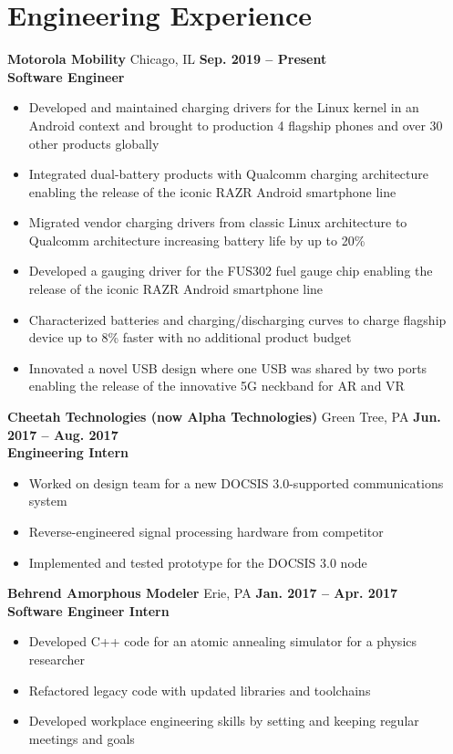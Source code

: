 \documentclass[letterpaper,10pt]{article}
\begin{document}
\section{Engineering Experience}
\textbf{Motorola Mobility} Chicago, IL \hfill \textbf{Sep. 2019 -- Present}\\
\textbf{Software Engineer}
\begin{itemize}
\item Developed and maintained charging drivers for the Linux kernel in an Android context and brought to production 4 flagship phones and over 30 other products globally
\item Integrated dual-battery products with Qualcomm charging architecture enabling the release of the iconic RAZR Android smartphone line
\item Migrated vendor charging drivers from classic Linux architecture to Qualcomm architecture increasing battery life by up to 20\%
\item Developed a gauging driver for the FUS302 fuel gauge chip enabling the release of the iconic RAZR Android smartphone line
\item Characterized batteries and charging/discharging curves to charge flagship device up to 8\% faster with no additional product budget
\item Innovated a novel USB design where one USB was shared by two ports enabling the release of the innovative 5G neckband for AR and VR
\end{itemize}
\textbf{Cheetah Technologies (now Alpha Technologies)} Green Tree, PA \hfill \textbf{Jun. 2017 -- Aug. 2017}\\
\textbf{Engineering Intern}
\begin{itemize}
\item Worked on design team for a new DOCSIS 3.0-supported communications system
\item Reverse-engineered signal processing hardware from competitor
\item Implemented and tested prototype for the DOCSIS 3.0 node
\end{itemize}
\textbf{Behrend Amorphous Modeler} Erie, PA \hfill \textbf{Jan. 2017 -- Apr. 2017}\\
\textbf{Software Engineer Intern}
\begin{itemize}
\item Developed C++ code for an atomic annealing simulator for a physics researcher
\item Refactored legacy code with updated libraries and toolchains
\item Developed workplace engineering skills by setting and keeping regular meetings and goals
\end{itemize}
\end{document}
